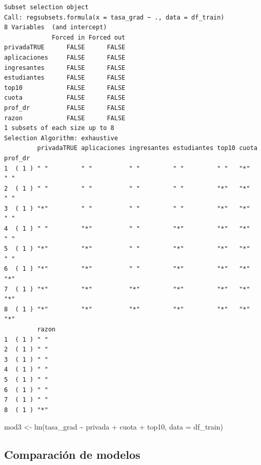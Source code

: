 \documentclass[
  letterpaper,
  DIV=11,
  numbers=noendperiod]{scrartcl}
\newenvironment{Shaded}{\begin{snugshade}}{\end{snugshade}}
\newcommand{\AttributeTok}[1]{\textcolor[rgb]{0.40,0.45,0.13}{#1}}
\newcommand{\FunctionTok}[1]{\textcolor[rgb]{0.28,0.35,0.67}{#1}}
\newcommand{\NormalTok}[1]{\textcolor[rgb]{0.00,0.23,0.31}{#1}}
\newcommand{\OtherTok}[1]{\textcolor[rgb]{0.00,0.23,0.31}{#1}}
\newcommand{\SpecialCharTok}[1]{\textcolor[rgb]{0.37,0.37,0.37}{#1}}
\begin{document}
\begin{verbatim}
Subset selection object
Call: regsubsets.formula(x = tasa_grad ~ ., data = df_train)
8 Variables  (and intercept)
             Forced in Forced out
privadaTRUE      FALSE      FALSE
aplicaciones     FALSE      FALSE
ingresantes      FALSE      FALSE
estudiantes      FALSE      FALSE
top10            FALSE      FALSE
cuota            FALSE      FALSE
prof_dr          FALSE      FALSE
razon            FALSE      FALSE
1 subsets of each size up to 8
Selection Algorithm: exhaustive
         privadaTRUE aplicaciones ingresantes estudiantes top10 cuota prof_dr
1  ( 1 ) " "         " "          " "         " "         " "   "*"   " "    
2  ( 1 ) " "         " "          " "         " "         "*"   "*"   " "    
3  ( 1 ) "*"         " "          " "         " "         "*"   "*"   " "    
4  ( 1 ) " "         "*"          " "         "*"         "*"   "*"   " "    
5  ( 1 ) "*"         "*"          " "         "*"         "*"   "*"   " "    
6  ( 1 ) "*"         "*"          " "         "*"         "*"   "*"   "*"    
7  ( 1 ) "*"         "*"          "*"         "*"         "*"   "*"   "*"    
8  ( 1 ) "*"         "*"          "*"         "*"         "*"   "*"   "*"    
         razon
1  ( 1 ) " "  
2  ( 1 ) " "  
3  ( 1 ) " "  
4  ( 1 ) " "  
5  ( 1 ) " "  
6  ( 1 ) " "  
7  ( 1 ) " "  
8  ( 1 ) "*"  
\end{verbatim}

\begin{Shaded}
\begin{Highlighting}[]
\NormalTok{mod3 }\OtherTok{\textless{}{-}} \FunctionTok{lm}\NormalTok{(tasa\_grad }\SpecialCharTok{\textasciitilde{}}\NormalTok{ privada }\SpecialCharTok{+}\NormalTok{ cuota }\SpecialCharTok{+}\NormalTok{ top10, }\AttributeTok{data =}\NormalTok{ df\_train)}
\end{Highlighting}
\end{Shaded}

\hypertarget{comparaciuxf3n-de-modelos}{%
\subsection{Comparación de modelos}\label{comparaciuxf3n-de-modelos}}
\end{document}

